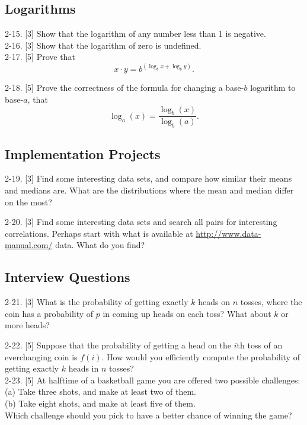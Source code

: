 \documentclass[10pt]{article}
\begin{document}
\subsection{Logarithms}
2-15. [3] Show that the logarithm of any number less than 1 is negative.\\

2-16. [3] Show that the logarithm of zero is undefined.\\[0pt]

2-17. [5] Prove that
\[
x \cdot y=b^{(\log_b x+\log_b y)}.
\]

2-18. [5] Prove the correctness of the formula for changing a base-$b$ logarithm to base-$a$, that
\[
\log_a(x)=\frac{\log_b(x)}{\log_b(a)}.
\]

\subsection{Implementation Projects}
2-19. [3] Find some interesting data sets, and compare how similar their means and medians are. What are the distributions where the mean and median differ on the most?

2-20. [3] Find some interesting data sets and search all pairs for interesting correlations. Perhaps start with what is available at \href{http://www.data-manual.com/}{http://www.data-manual.com/} data. What do you find?

\subsection{Interview Questions}
2-21. [3] What is the probability of getting exactly $k$ heads on $n$ tosses, where the coin has a probability of $p$ in coming up heads on each toss? What about $k$ or more heads?

2-22. [5] Suppose that the probability of getting a head on the $i$th toss of an everchanging coin is $f(i)$. How would you efficiently compute the probability of getting exactly $k$ heads in $n$ tosses?\\[0pt]

2-23. [5] At halftime of a basketball game you are offered two possible challenges:\\
(a) Take three shots, and make at least two of them.\\
(b) Take eight shots, and make at least five of them.\\

Which challenge should you pick to have a better chance of winning the game?\\[0pt]
\end{document}
